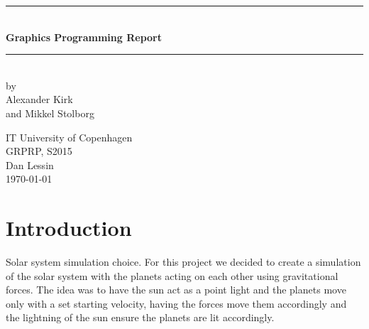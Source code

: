 \documentclass[a4paper,11pt]{article}
\begin{document}
\begin{titlepage}

\centering \parindent=0pt
\newcommand{\HRule}{\rule{\textwidth}{1mm}}
 \HRule\\[1cm]\Huge\bfseries
Graphics Programming Report\\[0.7cm]
\HRule\\[4cm]  
\large by 
\\Alexander Kirk
\\ and Mikkel Stolborg
 \normalsize %
\begin{flushleft}
IT University of Copenhagen \\
GRPRP, S2015\\
Dan Lessin\\
\today \end{flushleft}
\end{titlepage}

\tableofcontents
\pagebreak
\section{Introduction}
Solar system simulation choice.
For this project we decided to create a simulation of the solar system with the planets acting on each other using gravitational forces. The idea was to have the sun act as a point light and the planets move only with a set starting velocity, having the forces move them accordingly and the lightning of the sun ensure the planets are lit accordingly.



 
\end{document}
